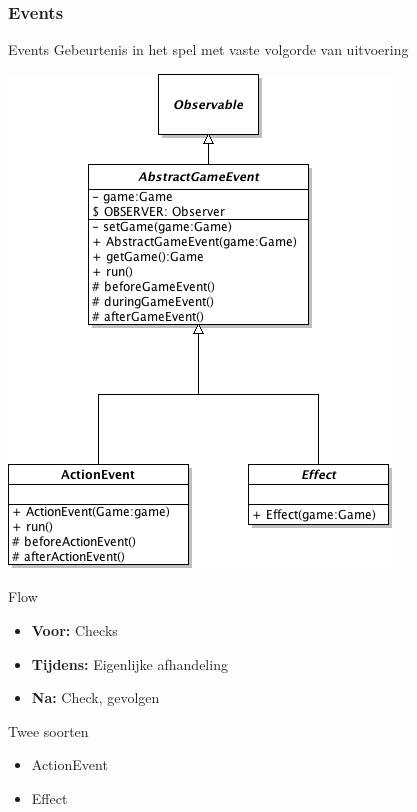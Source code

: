 \documentclass[t]{beamer}
\begin{document}
\subsubsection{Events}

\begin{frame}{Events}
Gebeurtenis in het spel met vaste volgorde van uitvoering

\begin{multicols}{2}
\begin{center}
\includegraphics[width=0.60\linewidth]{images/GameEvent}
\end{center}
Flow
\begin{itemize}
	\item \textbf{Voor:} Checks
	\item \textbf{Tijdens:} Eigenlijke afhandeling
	\item \textbf{Na:} Check, gevolgen
\end{itemize}
Twee soorten
\begin{itemize}
	\item ActionEvent
	\item Effect
\end{itemize}
\end{multicols}
\end{frame}
\end{document}
